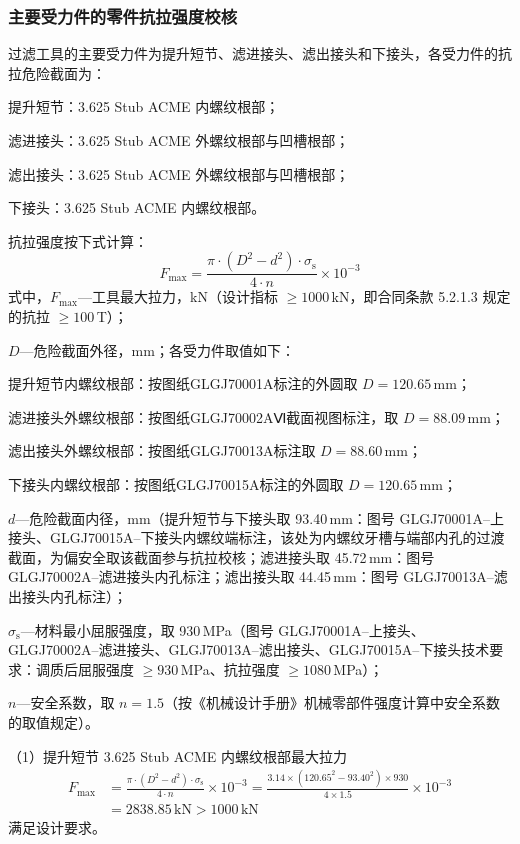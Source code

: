 \subsubsection{主要受力件的零件抗拉强度校核}

过滤工具的主要受力件为提升短节、滤进接头、滤出接头和下接头，各受力件的抗拉危险截面为：

提升短节：3.625 Stub ACME 内螺纹根部；

滤进接头：3.625 Stub ACME 外螺纹根部与凹槽根部；

滤出接头：3.625 Stub ACME 外螺纹根部与凹槽根部；

下接头：3.625 Stub ACME 内螺纹根部。

抗拉强度按下式计算：
\begin{equation}
F_{\max} = \frac{\pi \cdot (D^2 - d^2) \cdot \sigma_{\mathrm{s}}}{4 \cdot n} \times 10^{-3}
\end{equation}
式中，$F_{\max}$---工具最大拉力，kN（设计指标 $\ge 1000$\,kN，即合同条款 5.2.1.3 规定的抗拉 $\ge 100$\,T）；

$D$---危险截面外径，mm；各受力件取值如下：

\quad 提升短节内螺纹根部：按图纸GLGJ70001A标注的外圆取 $D = 120.65\,\text{mm}$；

\quad 滤进接头外螺纹根部：按图纸GLGJ70002AⅥ截面视图标注，取 $D = 88.09\,\text{mm}$；

\quad 滤出接头外螺纹根部：按图纸GLGJ70013A标注取 $D = 88.60\,\text{mm}$；

\quad 下接头内螺纹根部：按图纸GLGJ70015A标注的外圆取 $D = 120.65\,\text{mm}$；

$d$---危险截面内径，mm（提升短节与下接头取 93.40\,mm：图号 GLGJ70001A--上接头、GLGJ70015A--下接头内螺纹端标注，该处为内螺纹牙槽与端部内孔的过渡截面，为偏安全取该截面参与抗拉校核；滤进接头取 45.72\,mm：图号 GLGJ70002A--滤进接头内孔标注；滤出接头取 44.45\,mm：图号 GLGJ70013A--滤出接头内孔标注）；

$\sigma_{\mathrm{s}}$---材料最小屈服强度，取 930\,MPa（图号 GLGJ70001A--上接头、GLGJ70002A--滤进接头、GLGJ70013A--滤出接头、GLGJ70015A--下接头技术要求：调质后屈服强度 $\ge 930$\,MPa、抗拉强度 $\ge 1080$\,MPa）；

$n$---安全系数，取 $n = 1.5$（按《机械设计手册》机械零部件强度计算中安全系数的取值规定\cite{ref26}）。

（1）提升短节 3.625 Stub ACME 内螺纹根部最大拉力
\begin{equation}
    \begin{aligned}
        F_{\max} &= \frac{\pi \cdot (D^2 - d^2) \cdot \sigma_\mathrm{s}}{4 \cdot n} \times 10^{-3} 
                = \frac{3.14 \times (120.65^2 - 93.40^2) \times 930}{4 \times 1.5} \times 10^{-3} \\
                &= 2838.85\,\text{kN} > 1000\,\text{kN}
    \end{aligned}
\end{equation}
满足设计要求。

